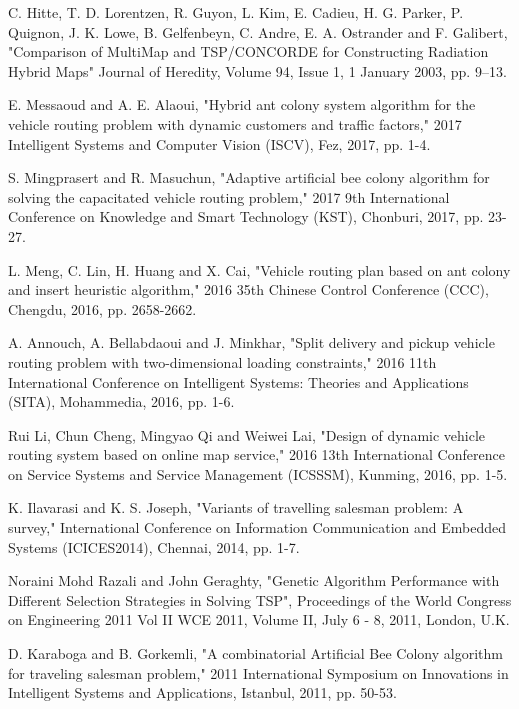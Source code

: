 \documentclass[conference]{IEEEtran}
\begin{document}
\begin{thebibliography}{00}

 C. Hitte, T. D. Lorentzen, R. Guyon, L. Kim, E. Cadieu, H. G. Parker, P. Quignon, J. K. Lowe, B. Gelfenbeyn, C. Andre, E. A. Ostrander and F. Galibert, "Comparison of MultiMap and TSP/CONCORDE for Constructing Radiation Hybrid Maps"  Journal of Heredity, Volume 94, Issue 1, 1 January 2003, pp. 9–13.

 E. Messaoud and A. E. Alaoui, "Hybrid ant colony system algorithm for the vehicle routing problem with dynamic customers and traffic factors," 2017 Intelligent Systems and Computer Vision (ISCV), Fez, 2017, pp. 1-4.

 S. Mingprasert and R. Masuchun, "Adaptive artificial bee colony algorithm for solving the capacitated vehicle routing problem," 2017 9th International Conference on Knowledge and Smart Technology (KST), Chonburi, 2017, pp. 23-27.

 L. Meng, C. Lin, H. Huang and X. Cai, "Vehicle routing plan based on ant colony and insert heuristic algorithm," 2016 35th Chinese Control Conference (CCC), Chengdu, 2016, pp. 2658-2662.

 A. Annouch, A. Bellabdaoui and J. Minkhar, "Split delivery and pickup vehicle routing problem with two-dimensional loading constraints," 2016 11th International Conference on Intelligent Systems: Theories and Applications (SITA), Mohammedia, 2016, pp. 1-6.

 Rui Li, Chun Cheng, Mingyao Qi and Weiwei Lai, "Design of dynamic vehicle routing system based on online map service," 2016 13th International Conference on Service Systems and Service Management (ICSSSM), Kunming, 2016, pp. 1-5.

 K. Ilavarasi and K. S. Joseph, "Variants of travelling salesman problem: A survey," International Conference on Information Communication and Embedded Systems (ICICES2014), Chennai, 2014, pp. 1-7.

 Noraini Mohd Razali and John Geraghty, "Genetic Algorithm Performance with Different Selection Strategies in Solving TSP", Proceedings of the World Congress on Engineering 2011 Vol II WCE 2011, Volume II, July 6 - 8, 2011, London, U.K.

 D. Karaboga and B. Gorkemli, "A combinatorial Artificial Bee Colony algorithm for traveling salesman problem," 2011 International Symposium on Innovations in Intelligent Systems and Applications, Istanbul, 2011, pp. 50-53.


\end{thebibliography}
\end{document}
